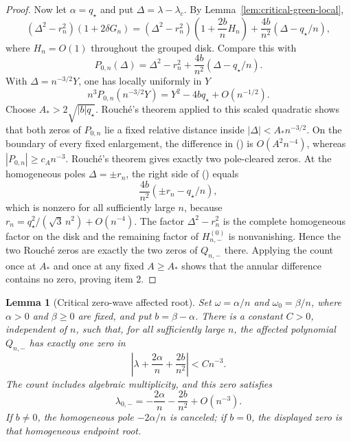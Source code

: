 \documentclass[twoside,10pt]{article}
\numberwithin{equation}{section}
\theoremstyle{slbody}
\newtheorem{lemma}[theorem]{Lemma}
\theoremstyle{definition}
\theoremstyle{remark}
\renewcommand{\eqref}[1]{%
  \textup{{\normalfont(\oldstylenums{\ref{#1}}}\normalfont)}}
\begin{document}
\begin{proof}
Now let $\alpha=q_\star$ and put $\Delta=\lambda-\lambda_c$.  By
Lemma~\ref{lem:critical-green-local},
\begin{equation}\label{eq:critical-grouped-pole-cleared}
 (\Delta^2-r_n^2)(1+2\delta G_n)
 = (\Delta^2-r_n^2)\left(1+\frac{2b}{n}H_n\right)
   +\frac{4b}{n^2}(\Delta-q_\star/n),
\end{equation}
where $H_n=O(1)$ throughout the grouped disk.  Compare this with
\[
 P_{0,n}(\Delta)=\Delta^2-r_n^2
                 +\frac{4b}{n^2}(\Delta-q_\star/n).
\]
With $\Delta=n^{-3/2}Y$, one has locally uniformly in $Y$
\[
 n^3P_{0,n}(n^{-3/2}Y)=Y^2-4bq_\star+O(n^{-1/2}).
\]
Choose $A_*>2\sqrt{|b|q_\star}$.  Rouch\'e's theorem applied to this scaled
quadratic shows that both zeros of $P_{0,n}$ lie a fixed relative
distance inside $|\Delta|<A_*n^{-3/2}$.  On the boundary of every fixed
enlargement, the difference in
\eqref{eq:critical-grouped-pole-cleared} is $O(A^2n^{-4})$, whereas
$|P_{0,n}|\ge c_A n^{-3}$.  Rouch\'e's theorem gives exactly two
pole-cleared zeros.  At the homogeneous poles $\Delta=\pm r_n$, the
right side of \eqref{eq:critical-grouped-pole-cleared} equals
\[
 \frac{4b}{n^2}(\pm r_n-q_\star/n),
\]
which is nonzero for all sufficiently large $n$, because
$r_n=q_\star^2/(\sqrt3\,n^2)+O(n^{-4})$.  The factor
$\Delta^2-r_n^2$ is the complete homogeneous factor on the disk and
the remaining factor of $H_{n,-}^{(0)}$ is nonvanishing.  Hence the two
Rouch\'e zeros are exactly the two zeros of $Q_{n,-}$ there.  Applying
the count once at $A_*$ and once at any fixed $A\ge A_*$ shows that the
annular difference contains no zero, proving item 2.
\end{proof}

\begin{lemma}[Critical zero-wave affected root]
\label{lem:critical-endpoint-root}
Set $\omega=\alpha/n$ and $\omega_0=\beta/n$, where
$\alpha>0$ and $\beta\ge0$ are fixed, and put $b=\beta-\alpha$.
There is a constant $C>0$, independent of $n$, such that, for all sufficiently
large $n$, the affected polynomial $Q_{n,-}$ has exactly one zero in
\[
 \left|\lambda+\frac{2\alpha}{n}+\frac{2b}{n^2}\right|<Cn^{-3}.
\]
The count includes algebraic multiplicity, and this zero satisfies
\begin{equation}\label{eq:critical-endpoint-root}
 \lambda_{0,-}=-\frac{2\alpha}{n}-\frac{2b}{n^2}+O(n^{-3}).
\end{equation}
If $b\ne0$, the homogeneous pole $-2\alpha/n$ is canceled; if $b=0$,
the displayed zero is that homogeneous endpoint root.
\end{lemma}
\end{document}
